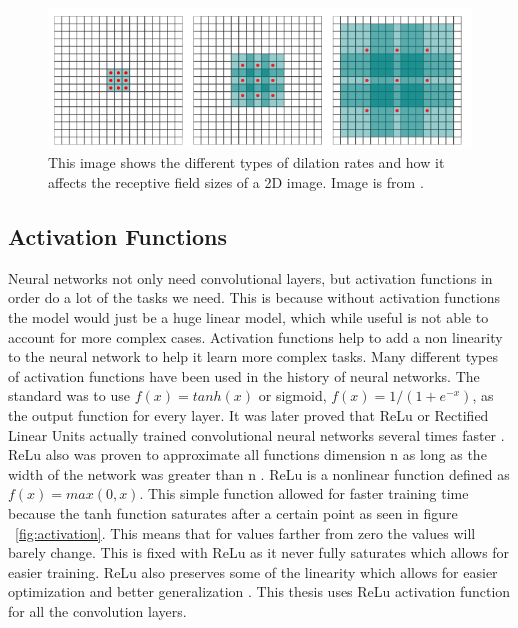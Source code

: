 \begin{figure}[tbh]
\centering
\includegraphics[width=\textwidth]{dilated_convolutions.png}
\caption{This image shows the different types of dilation rates and how it affects the receptive field sizes of a 2D image. Image is from \cite{Yu2016MultiScaleCA}. }
\label{fig_dil_convolution}
\end{figure}     

\subsection{Activation Functions}    
    Neural networks not only need convolutional layers, but activation functions in order do a lot of the tasks we need.
    This is because without activation functions the model would just be a huge linear model, which while useful is not able to account for more complex cases.
    Activation functions help to add a non linearity to the neural network to help it learn more complex tasks.
    Many different types of activation functions have been used in the history of neural networks. 
    The standard was to use $f(x) = tanh(x)$  or sigmoid, $f(x) = 1/(1+e^{-x})$, as the output function for every layer. 
    It was later proved that ReLu or Rectified Linear Units actually trained convolutional neural networks several times faster \cite{NIPS2012_Krizhevsky}. ReLu also was proven to approximate all functions dimension n as long as the width of the network was greater than n \cite{NIPS2017_ReLuUniversalTheorem}. 
    ReLu is a nonlinear function defined as $f(x) = max(0, x)$. 
    This simple function allowed for faster training time because the tanh function saturates after a certain point as seen in figure ~\ref{fig:activation}. 
    This means that for values farther from zero the values will barely change. 
    This is fixed with ReLu as it never fully saturates which allows for easier training. 
    ReLu also preserves some of the linearity which allows for easier optimization and better generalization \cite{Goodfellow-et-al-2016}. 
    This thesis uses ReLu activation function for all the convolution layers.

